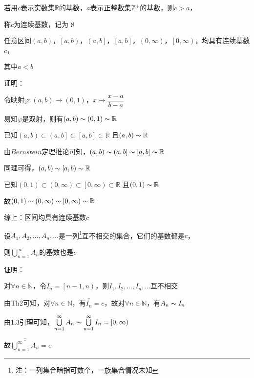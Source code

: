 \begin{la}
若用$c$表示实数集$\mathbb{R}$的基数，$a$表示正整数集$\mathbb{Z}^{+}$的基数，则$c > a$，
\par \quad \quad 称$c$为连续基数，记为$\aleph $
\end{la}

\begin{td}
任意区间$\left(a,b\right) $，$\left[a,b\right) $，$\left(a,b\right] $，$\left[a,b\right] $，$\left(0,\infty\right) $，$\left[0,\infty\right) $，均具有连续基数$c$，
\par \quad \quad \quad \quad 其中$a < b$    
\end{td}
\noindent 证明：
\par 令映射$\varphi : \left(a,b\right) \to \left(0,1\right) $，$x \mapsto \dfrac{x - a}{b - a}$
\par 易知$\varphi$是双射，则有$\left(a,b\right) \thicksim \left(0,1\right) \thicksim \mathbb{R}$
\par 已知$\left(a,b\right) \subset \left(a,b\right] \subset \left[a,b\right] \subset \mathbb{R}$ 且$\left(a,b\right) \thicksim \mathbb{R}$
\par 由$Bernstein$定理推论可知，$\left(a,b\right) \thicksim \left(a,b\right] \thicksim \left[a,b\right] \thicksim \mathbb{R}$ 
\par 同理可得，$\left(a,b\right) \thicksim \left[a,b\right) \thicksim \mathbb{R}$ 
\par 已知$\left(0,1\right) \subset \left(0,\infty\right) \subset \left[0,\infty\right) \subset \mathbb{R}$ 且$\left(0,1\right) \thicksim \mathbb{R}$
\par 故$\left(0,1\right) \thicksim \left(0,\infty\right) \thicksim \left[0,\infty\right) \thicksim \mathbb{R}$
\par 综上：区间均具有连续基数$c$

\begin{td}
设$A_{1},A_{2},\dots,A_{n},\dots$是一列\footnote{注：一列集合暗指可数个，一族集合情况未知}互不相交的集合，它们的基数都是$c$，
\par \quad \quad \quad \quad 则$\bigcup \limits_{n=1}^{\infty}A_{n}$的基数也是$c$ 
\normalsize    
\end{td}
\noindent 证明：
\par 对$\forall n \in \mathbb{N}$，令$I_{n} = \left[n-1,n\right) $，则$I_{1},I_{2},\dots,I_{n},\dots$互不相交
\par 由Th2可知，对$\forall n \in \mathbb{N}$，有$\overline{\overline{I_{n}} } = c$，故对$\forall n \in \mathbb{N}$，有$A_{n} \thicksim I_{n}$
\par 由1.3引理可知，$\bigcup \limits_{n=1}^{\infty}A_{n} \thicksim \bigcup \limits_{n=1}^{\infty}I_{n} = \left[0,\infty\right) $
\par 故$\overline{\overline{\bigcup \limits_{n=1}^{\infty}A_{n}}} = c $

